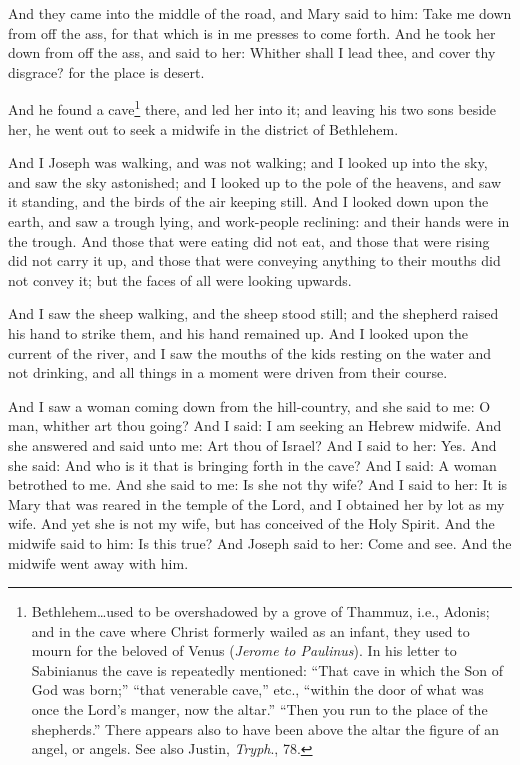 \pend\pstart
And they came into the middle of the road, and Mary said to him: Take me down from off the ass, for that which is in me presses to come forth. And he took her down from off the ass, and said to her: Whither shall I lead thee, and cover thy disgrace? for the place is desert.

\pend\pstart
{}

\pend\pstart
And he found a cave\footnote{Bethlehem…used to be overshadowed by a grove of Thammuz, i.e., Adonis; and in the cave where Christ formerly wailed as an infant, they used to mourn for the beloved of Venus (\textit{Jerome to Paulinus}). In his letter to Sabinianus the cave is repeatedly mentioned: ``That cave in which the Son of God was born;'' ``that venerable cave,'' etc., ``within the door of what was once the Lord's manger, now the altar.'' ``Then you run to the place of the shepherds.'' There appears also to have been above the altar the figure of an angel, or angels. See also Justin, \textit{Tryph}., 78.} there, and led her into it; and leaving his two sons beside her, he went out to seek a midwife in the district of Bethlehem.

\pend\pstart
And I Joseph was walking, and was not walking; and I looked up into the sky, and saw the sky astonished; and I looked up to the pole of the heavens, and saw it standing, and the birds of the air keeping still. And I looked down upon the earth, and saw a trough lying, and work-people reclining: and their hands were in the trough. And those that were eating did not eat, and those that were rising did not carry it up, and those that were conveying anything to their mouths did not convey it; but the faces of all were looking upwards.

\pend\pstart
And I saw the sheep walking, and the sheep stood still; and the shepherd raised his hand to strike them, and his hand remained up. And I looked upon the current of the river, and I saw the mouths of the kids resting on the water and not drinking, and all things in a moment were driven from their course.

\pend\pstart
{}

\pend\pstart
And I saw a woman coming down from the hill-country, and she said to me: O man, whither art thou going? And I said: I am seeking an Hebrew midwife. And she answered and said unto me: Art thou of Israel? And I said to her: Yes. And she said: And who is it that is bringing forth in the cave? And I said: A woman betrothed to me. And she said to me: Is she not thy wife? And I said to her: It is Mary that was reared in the temple of the Lord, and I obtained her by lot as my wife. And yet she is not my wife, but has conceived of the Holy Spirit. And the midwife said to him: Is this true? And Joseph said to her: Come and see. And the midwife went away with him.

